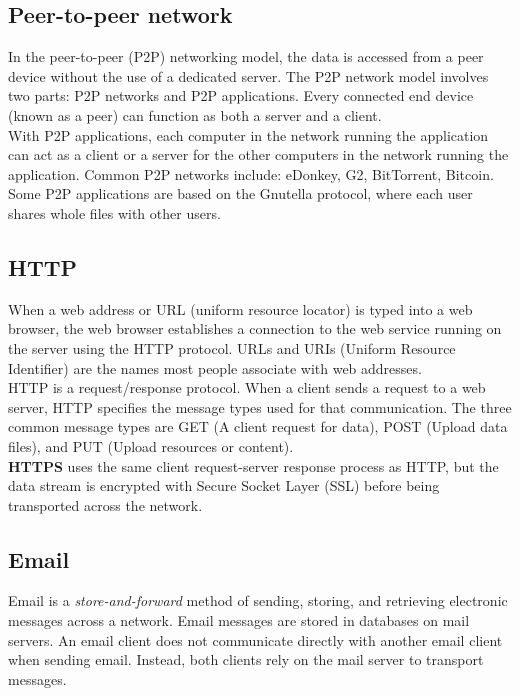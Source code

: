 \subsection{Peer-to-peer network}

In the peer-to-peer (P2P) networking model, the data is accessed from a peer device without the use of a dedicated server. The P2P network model involves two parts: P2P networks and P2P applications. Every connected end device (known as a peer) can function as both a server and a client. \\

With P2P applications, each computer in the network running the application can act as a client or a server for the other computers in the network running the application. Common P2P networks include: eDonkey, G2, BitTorrent, Bitcoin. Some P2P applications are based on the Gnutella protocol, where each user shares whole files with other users. 

\subsection{HTTP}

When a web address or URL (uniform resource locator) is typed into a web browser, the web browser establishes a connection to the web service running on the server using the HTTP protocol. URLs and URIs (Uniform Resource Identifier) are the names most people associate with web addresses.\\

HTTP is a request/response protocol. When a client sends a request to a web server, HTTP specifies the message types used for that communication. The three common message types are GET (A client request for data), POST (Upload data files), and PUT (Upload resources or content).\\

\textbf{HTTPS} uses the same client request-server response process as HTTP, but the data stream is encrypted with Secure Socket Layer (SSL) before being transported across the network.

\subsection{Email}

Email is a \emph{store-and-forward} method of sending, storing, and retrieving electronic messages across a network. Email messages are stored in databases on mail servers. An email client does not communicate directly with another email client when sending email. Instead, both clients rely on the mail server to transport messages. \\

